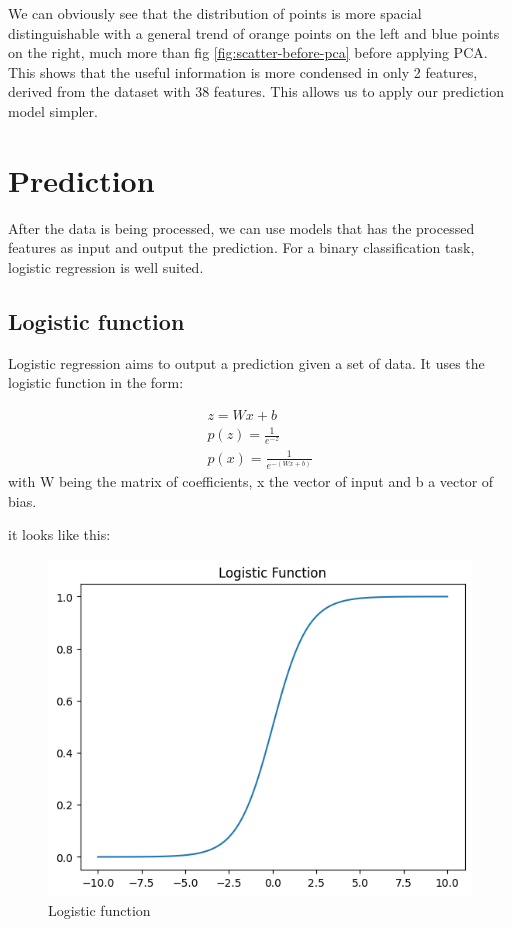 \documentclass[stu,12pt,floatsintext]{apa7}
\begin{document}
We can obviously see that the distribution of points is more spacial distinguishable with a general trend of orange points on the left and blue points on the right, much more than fig \ref{fig:scatter-before-pca} before applying PCA. This shows that the useful information is more condensed in only 2 features, derived from the dataset with 38 features. This allows us to apply our prediction model simpler. 

\section{Prediction}
After the data is being processed, we can use models that has the processed features as input and output the prediction. For a binary classification task, logistic regression is well suited.

\subsection{Logistic function}

Logistic regression \parencite{logistic-regression} aims to output a prediction given a set of data. It uses the logistic function in the form:

\begin{gather}
    z=Wx+b\\
    p(z)=\frac{1}{e^{-z}}\\
    p(x)=\frac{1}{e^{-(Wx+b)}}
\end{gather}
with W being the matrix of coefficients, x the vector of input and b a vector of bias.

it looks like this:

\begin{figure}[h]
    \centering
    \includegraphics[width=0.6\linewidth]{images/logistic-function.png}
    \caption{Logistic function}
    \label{fig:enter-label}
\end{figure}
\end{document}
